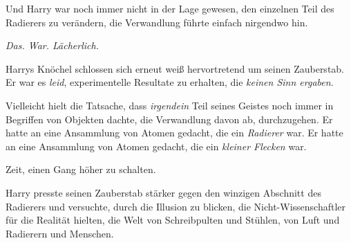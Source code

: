 Und Harry war noch immer nicht in der Lage gewesen, den einzelnen Teil des Radierers zu verändern, die Verwandlung führte einfach nirgendwo hin.

\emph{Das. War. Lächerlich.}

Harrys Knöchel schlossen sich erneut weiß hervortretend um seinen Zauberstab. Er war es \emph{leid}, experimentelle Resultate zu erhalten, die \emph{keinen Sinn ergaben.}

Vielleicht hielt die Tatsache, dass \emph{irgendein} Teil seines Geistes noch immer in Begriffen von Objekten dachte, die Verwandlung davon ab, durchzugehen. Er hatte an eine Ansammlung von Atomen gedacht, die ein \emph{Radierer} war. Er hatte an eine Ansammlung von Atomen gedacht, die ein \emph{kleiner Flecken} war.

Zeit, einen Gang höher zu schalten.

Harry presste seinen Zauberstab stärker gegen den winzigen Abschnitt des Radierers und versuchte, durch die Illusion zu blicken, die Nicht-Wissenschaftler für die Realität hielten, die Welt von Schreibpulten und Stühlen, von Luft und Radierern und Menschen.

